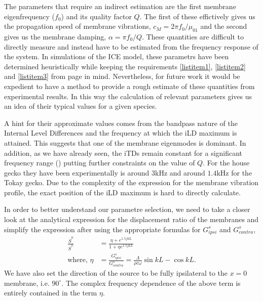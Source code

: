 The parameters that require an indirect estimation are the first membrane eigenfrequency ($f_0$) and
its quality factor $Q$. The first of these effictively gives us the propagation speed of membrane vibrations, $c_M=2\pi f_0/\mu_{01}$ 
and the second gives us the membrane damping, $\alpha=\pi f_0/Q$. These quantities are difficult to directly measure and instead
have to be estimated from the frequency response of the system. In simulations of the ICE model, these parametrs have been determined heuristically
while keeping the requirements \ref{listitem1}, \ref{listitem2} and \ref{listitem3} from page \pageref{listitem1} in mind. Nevertheless, for future work
it would be expedient to have a method to provide a rough estimate of these quantities from experimental results. In this way the calculation
of relevant parameters gives us an idea of their typical values for a given species.

A hint for their approximate values comes from the bandpass nature of the Internal Level Differences and the frequency at which the iLD maximum is attained.
This suggests that one of the membrane eigenmodes is dominant. In addition, as we have already seen, the iTDs remain constant for a significant frequency
range (\cite[p~.1996]{dalsgaardtangcarr}) putting further constraints on the value of $Q$. For the house gecko they have been experimentally is around $3$kHz and
 around $1.4$kHz for the Tokay gecko. Due to the complexity of the expression for the membrane vibration profile, the exact position of the iLD maximum is hard to directly calculate.

In order to better understand our parametre selection, we 
need to take a closer look at the analytical expression for the displacement ratio of the membranes and  simplify the expression after using the appropriate formulas for $G^s_{ipsi}$ and $G^s_{contra}$,
\begin{align}
 \frac{\dot{S}^0}{\dot{S}^L}&=\frac{\eta+e^{1.5jkL}}{1+\eta e^{1.5jkL}}\label{displacementratio}\\
 \mbox{where, }\eta&=\frac{G^s_{ipsi}}{G^s_{contra}}=\frac{\Lambda}{\rho c\omega}\sin kL-\cos kL.\nonumber
\end{align}
We have also set the direction of the source to be fully ipsilateral to the $x=0$ membrane, i.e. $90^\circ$. The complex frequency
dependence of the above term is entirely contained in the term $\eta$.

